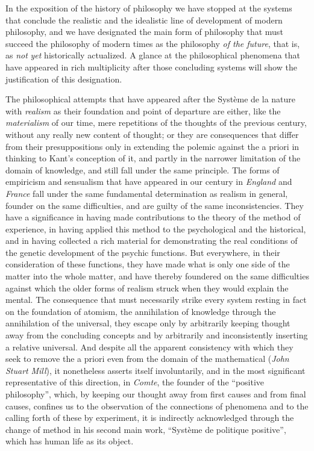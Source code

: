 \divrule

In the exposition of the history of philosophy we have stopped at the
systems that conclude the realistic and the idealistic line of
development of modern philosophy, and we have designated the main form
of philosophy that must succeed the philosophy of modern times as the
philosophy \emph{of the future}, that is, as \emph{not} \emph{yet}
historically actualized. A glance at the philosophical phenomena that
have appeared in rich multiplicity after those concluding
systems will show the justification of this designation.

The philosophical attempts that have appeared after the Système de la
nature with \emph{realism} as their foundation and point of departure
are either, like the \emph{materialism} of our time, mere repetitions
of the thoughts of the previous century, without any really new content
of thought; or they are consequences that differ from their
presuppositions only in extending the polemic against the a priori in
thinking to Kant's conception of it, and partly in the narrower
limitation of the domain of knowledge, and still fall under the same
principle. The forms of empiricism and sensualism that have appeared in
our century in \emph{England} and \emph{France} fall under the same
fundamental determination as realism in general, founder on the same
difficulties, and are guilty of the same inconsistencies. They have a
significance in having made contributions to the theory of the method
of experience, in having applied this method to the psychological and
the historical, and in having collected a rich material for
demonstrating the real conditions of the genetic development of the
psychic functions. But everywhere, in their consideration of these
functions, they have made what is only one side of the matter into the
whole matter, and have thereby foundered on the same difficulties
against which the older forms of realism struck when they would explain
the mental. The consequence that must necessarily strike every system
resting in fact on the foundation of atomism, the annihilation of
knowledge through the annihilation of the universal, they escape only
by arbitrarily keeping thought away from the concluding concepts and by
arbitrarily and inconsistently inserting a relative universal. And
despite all the apparent consistency with which they seek to remove the
a priori even from the domain of the mathematical (\emph{John Stuart}
\emph{Mill}), it nonetheless asserts itself involuntarily, and in the
most significant representative of this direction, in \emph{Comte}, the
founder of the ``positive philosophy'', which, by keeping our
thought away from first causes and from final causes, confines us to
the observation of the connections of phenomena and to the calling
forth of these by experiment, it is indirectly acknowledged through the
change of method in his second main work, ``Système de politique
positive'', which has human life as its object.

